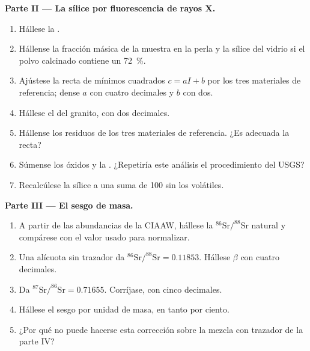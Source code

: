\begin{problem}
\noindent\textbf{Parte II --- La sílice por fluorescencia de rayos X.}
\begin{enumerate}[resume]
  \item Hállese la .
  \item Hállense la fracción másica de la muestra en la perla y la sílice del vidrio si el
        polvo calcinado contiene un \qty{72}{\percent}.
  \item Ajústese la recta de mínimos cuadrados $c = aI + b$ por los tres materiales de referencia; dense $a$ con
        cuatro decimales y $b$ con dos.
  \item Hállese el  del granito, con dos decimales.
  \item Hállense los residuos de los tres materiales de referencia. ¿Es adecuada la recta?
  \item Súmense los óxidos y la . ¿Repetiría este análisis el procedimiento del USGS?
  \item Recalcúlese la sílice a una suma de 100 sin los volátiles.
\end{enumerate}

\noindent\textbf{Parte III --- El sesgo de masa.}
\begin{enumerate}[resume]
  \item A partir de las abundancias de la CIAAW, hállese la $^{86}\mathrm{Sr}/^{88}\mathrm{Sr}$ natural y compárese
        con el valor usado para normalizar.
  \item Una alícuota sin trazador da $^{86}\mathrm{Sr}/^{88}\mathrm{Sr} = 0.11853$. Hállese $\beta$ con
        cuatro decimales.
  \item Da $^{87}\mathrm{Sr}/^{86}\mathrm{Sr} = 0.71655$. Corríjase, con cinco decimales.
  \item Hállese el sesgo por unidad de masa, en tanto por ciento.
  \item ¿Por qué no puede hacerse esta corrección sobre la mezcla con trazador de la parte IV?
\end{enumerate}


\end{problem}

